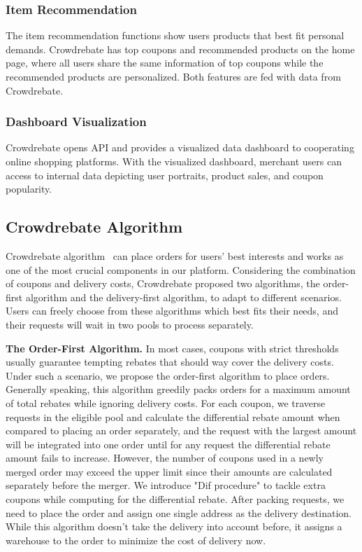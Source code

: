 \subsubsection{Item Recommendation}

The item recommendation functions show users products that best fit personal demands. Crowdrebate has top coupons and recommended products on the home page, where all users share the same information of top coupons while the recommended products are personalized. Both features are fed with data from Crowdrebate.

\subsubsection{Dashboard Visualization}

Crowdrebate opens API and provides a visualized data dashboard to cooperating online shopping platforms. With the visualized dashboard, merchant users can access to internal data depicting user portraits, product sales, and coupon popularity.

\subsection{Crowdrebate Algorithm}

Crowdrebate algorithm~\cite{Report} can place orders for users' best interests and works as one of the most crucial components in our platform. Considering the combination of coupons and delivery costs, Crowdrebate proposed two algorithms, the order-first algorithm and the delivery-first algorithm, to adapt to different scenarios. Users can freely choose from these algorithms which best fits their needs, and their requests will wait in two pools to process separately.

\textbf{The Order-First Algorithm.} In most cases, coupons with strict thresholds usually guarantee tempting rebates that should way cover the delivery costs. Under such a scenario, we propose the order-first algorithm to place orders. Generally speaking, this algorithm greedily packs orders for a maximum amount of total rebates while ignoring delivery costs. For each coupon, we traverse requests in the eligible pool and calculate the differential rebate amount when compared to placing an order separately, and the request with the largest amount will be integrated into one order until for any request the differential rebate amount fails to increase. However, the number of coupons used in a newly merged order may exceed the upper limit since their amounts are calculated separately before the merger. We introduce "Dif procedure" to tackle extra coupons while computing for the differential rebate. After packing requests, we need to place the order and assign one single address as the delivery destination. While this algorithm doesn't take the delivery into account before, it assigns a warehouse to the order to minimize the cost of delivery now.


